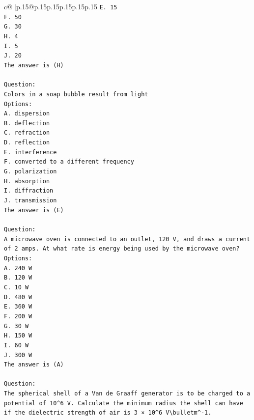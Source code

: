\documentclass{article}
\begin{document}
{\begin{supertabular}{c@{$\;$}|p{.15\linewidth}@{}p{.15\linewidth}p{.15\linewidth}p{.15\linewidth}p{.15\linewidth}p{.15\linewidth}}
{{{\texttt{E. 15} \\
\texttt{F. 50} \\
\texttt{G. 30} \\
\texttt{H. 4} \\
\texttt{I. 5} \\
\texttt{J. 20} \\
\texttt{The answer is (H)} \\
\\ 
\texttt{Question:} \\
\texttt{Colors in a soap bubble result from light} \\
\texttt{Options:} \\
\texttt{A. dispersion} \\
\texttt{B. deflection} \\
\texttt{C. refraction} \\
\texttt{D. reflection} \\
\texttt{E. interference} \\
\texttt{F. converted to a different frequency} \\
\texttt{G. polarization} \\
\texttt{H. absorption} \\
\texttt{I. diffraction} \\
\texttt{J. transmission} \\
\texttt{The answer is (E)} \\
\\ 
\texttt{Question:} \\
\texttt{A microwave oven is connected to an outlet, 120 V, and draws a current of 2 amps. At what rate is energy being used by the microwave oven?} \\
\texttt{Options:} \\
\texttt{A. 240 W} \\
\texttt{B. 120 W} \\
\texttt{C. 10 W} \\
\texttt{D. 480 W} \\
\texttt{E. 360 W} \\
\texttt{F. 200 W} \\
\texttt{G. 30 W} \\
\texttt{H. 150 W} \\
\texttt{I. 60 W} \\
\texttt{J. 300 W} \\
\texttt{The answer is (A)} \\
\\ 
\texttt{Question:} \\
\texttt{The spherical shell of a Van de Graaff generator is to be charged to a potential of 10\^{}6 V. Calculate the minimum radius the shell can have if the dielectric strength of air is 3 × 10\^{}6 V\textbackslash{}bulletm\^{}{-}1.} \\
}}}
\end{supertabular}}
\end{document}

